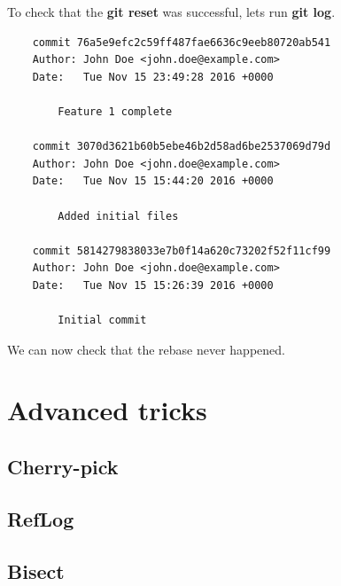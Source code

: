 \documentclass{article}
\begin{document}
To check that the \textbf{git reset} was successful, lets run \textbf{git log}.

\begin{lstlisting}
	commit 76a5e9efc2c59ff487fae6636c9eeb80720ab541
	Author: John Doe <john.doe@example.com>
	Date:   Tue Nov 15 23:49:28 2016 +0000

    	Feature 1 complete

	commit 3070d3621b60b5ebe46b2d58ad6be2537069d79d
	Author: John Doe <john.doe@example.com>
	Date:   Tue Nov 15 15:44:20 2016 +0000

    	Added initial files

	commit 5814279838033e7b0f14a620c73202f52f11cf99
	Author: John Doe <john.doe@example.com>
	Date:   Tue Nov 15 15:26:39 2016 +0000

    	Initial commit
\end{lstlisting}

We can now check that the rebase never happened.

\section{Advanced tricks}

\subsection{Cherry-pick}

\subsection{RefLog}

\subsection{Bisect}

\subsection{}
\end{document}
